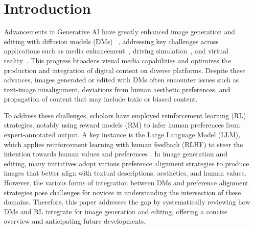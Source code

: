 \section{Introduction}
\par \noindent Advancements in Generative AI have greatly enhanced image generation and editing with diffusion models (DMs) ~\citep{ramesh2022hierarchical,saharia2022photorealistic}, addressing key challenges across applications such as media enhancement~\citep{zhou2024surveygenerativeaillm}, driving simulation~\citep{guan2024world}, and virtual reality~\citep{10765093}. This progress broadens visual media capabilities and optimizes the production and integration of digital content on diverse platforms. Despite these advances, images generated or edited with DMs often encounter issues such as text-image misalignment, deviations from human aesthetic preferences, and propagation of content that may include toxic or biased content. %

To address these challenges, scholars have employed reinforcement learning (RL) strategies, notably using reward models (RM) to infer human preferences from expert-annotated output. A key instance is the Large Language Model (LLM), which applies reinforcement learning with human feedback (RLHF) to steer the intention towards human values and preferences \citep{achiam2023gpt}. In image generation and editing, many initiatives adopt various preference alignment strategies to produce images that better align with textual descriptions, aesthetics, and human values. However, the various forms of integration between DMs and preference alignment strategies pose challenges for novices in understanding the intersection of these domains. Therefore, this paper addresses the gap by systematically reviewing how DMs and RL integrate for image generation and editing, offering a concise overview and anticipating future developments. %

